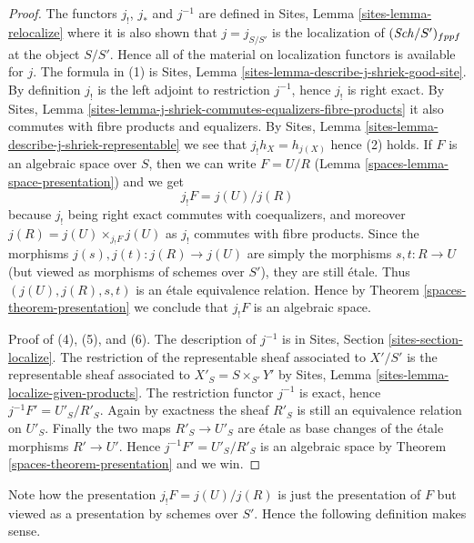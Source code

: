 \begin{proof}

The functors $j_!$, $j_*$ and $j^{-1}$ are defined in
Sites, Lemma \ref{sites-lemma-relocalize}
where it is also shown that $j = j_{S/S'}$ is the localization
of $(\mathit{Sch}/S')_{fppf}$ at the object $S/S'$. Hence
all of the material on localization functors is available for $j$.
The formula in (1) is
Sites, Lemma \ref{sites-lemma-describe-j-shriek-good-site}.
By definition $j_!$ is the left adjoint to restriction $j^{-1}$,
hence $j_!$ is right exact. By
Sites, Lemma \ref{sites-lemma-j-shriek-commutes-equalizers-fibre-products}
it also commutes with fibre products and equalizers.
By
Sites, Lemma \ref{sites-lemma-describe-j-shriek-representable}
we see that $j_!h_X = h_{j(X)}$ hence (2) holds.
If $F$ is an algebraic space over $S$, then we can write $F = U/R$
(Lemma \ref{spaces-lemma-space-presentation})
and we get
$$
j_!F = j(U)/j(R)
$$
because $j_!$ being right exact commutes with coequalizers, and moreover
$j(R) = j(U) \times_{j_!F} j(U)$ as $j_!$ commutes with fibre products.
Since the morphisms $j(s), j(t) : j(R) \to j(U)$ are simply the morphisms
$s, t : R \to U$ (but viewed as morphisms of schemes over $S'$), they
are still \'etale. Thus $(j(U), j(R), s, t)$ is an \'etale equivalence relation.
Hence by
Theorem \ref{spaces-theorem-presentation}
we conclude that $j_!F$ is an algebraic space.

\medskip\noindent
Proof of (4), (5), and (6). The description of $j^{-1}$ is in
Sites, Section \ref{sites-section-localize}.
The restriction of the representable sheaf associated to $X'/S'$
is the representable sheaf associated to
$X'_S = S \times_{S'} Y'$ by
Sites, Lemma \ref{sites-lemma-localize-given-products}.
The restriction functor $j^{-1}$ is exact, hence $j^{-1}F' = U'_S/R'_S$.
Again by exactness the sheaf $R'_S$ is still an equivalence relation on
$U'_S$. Finally the two maps $R'_S \to U'_S$ are \'etale as base changes
of the \'etale morphisms $R' \to U'$. Hence $j^{-1}F' = U'_S/R'_S$ is
an algebraic space by
Theorem \ref{spaces-theorem-presentation}
and we win.
\end{proof}

Note how the presentation $j_!F = j(U)/j(R)$ is just the presentation
of $F$ but viewed as a presentation by schemes over $S'$. Hence the
following definition makes sense.

